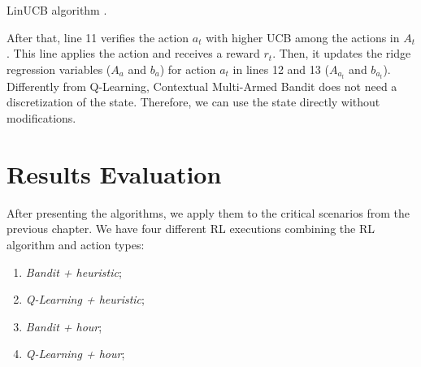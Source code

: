 \IncMargin{1em}
\begin{algorithm}[!htb]
    \footnotesize
    \SetAlgoLined
    \caption{LinUCB algorithm \cite{li2010contextual}.}
    \label{alg:linucb}
\end{algorithm}
\DecMargin{1em}

After that, line 11 verifies the action $a_t$ with higher UCB among the actions in $A_t$. This line applies the action and receives a reward $r_t$. Then, it updates the ridge regression variables ($A_a$ and $b_a$) for action $a_t$ in lines 12 and 13 ($A_{a_{t}}$ and $b_{a_{t}}$). Differently from Q-Learning, Contextual Multi-Armed Bandit does not need a discretization of the state. Therefore, we can use the state directly without modifications.

\section{Results Evaluation}

After presenting the algorithms, we apply them to the critical scenarios from the previous chapter. We have four different RL executions combining the RL algorithm and action types: 

\begin{enumerate}
    \item \emph{Bandit + heuristic};
    \item \emph{Q-Learning + heuristic};
    \item \emph{Bandit + hour};
    \item \emph{Q-Learning + hour};
\end{enumerate}

